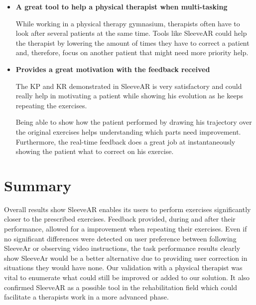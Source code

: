 \begin{itemize}
\item \textbf{A great tool to help a physical therapist when multi-tasking}

While working in a physical therapy gymnasium, therapists often have to look after several patients at the same time. Tools like SleeveAR could help the therapist by lowering the amount of times they have to correct a patient and, therefore, focus on another patient that might need more priority help.


\item \textbf{Provides a great motivation with the feedback received}

The \ac{KP} and \ac{KR} demonstrated in SleeveAR is very satisfactory and could really help in motivating a patient while showing his evolution as he keeps repeating the exercises.

Being able to show how the patient performed by drawing his trajectory over the original exercises helps understanding which parts need improvement. Furthermore, the real-time feedback does a great job at instantaneously showing the patient what to correct on his exercise.

\end{itemize}

\section{Summary}

Overall results show SleeveAR enables its users to perform exercises significantly closer to the prescribed exercises. 
Feedback provided, during and after their performance, allowed for a improvement when repeating their exercises. 
Even if no significant differences were detected on user preference between following SleeveAr or observing video instructions, 
the task performance results clearly show SleeveAr would be a better alternative due to providing user correction in situations they would have none.
Our validation with a physical therapist was vital to enumerate what could still be improved or added to our solution. 
It also confirmed SleeveAR as a possible tool in the rehabilitation field which could facilitate a therapists work in a more advanced phase.